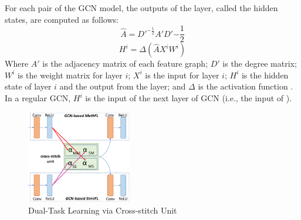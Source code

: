 \vspace{2pt}
For each pair of the GCN model, the outputs of the
 layer, called the hidden states, are computed as follows:
\begin{equation}\label{eq:1}
	\hat{A} = D'^{-\frac{1}{2}}A'D'{-\frac{1}{2}}
\end{equation}
\begin{equation}\label{eq:2}
	H^{i} = \Delta(\hat{A}X^{i}W^{i})
\end{equation}
Where $A'$ is the adjacency matrix of each feature graph; $D'$ is the
degree matrix; $W^{i}$ is the weight matrix for layer $i$; $X^{i}$ is
the input for layer $i$; $H^{i}$ is the hidden state of layer $i$ and
the output from the  layer; and $\Delta$ is the activation
function .
In a regular GCN, $H^{i}$ is the input of the next layer of GCN (i.e.,
the input of ).



\begin{figure}[t]
	\centering
	\includegraphics[width=1.8in]{graphs/cross-stitch-2.png}
        \vspace{-6pt}
	\caption{Dual-Task Learning via Cross-stitch Unit}
	\label{cross-stitch}
\end{figure}

